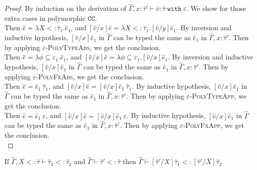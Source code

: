 \documentclass{llncs}
\newcommand{\keywadj}[1]{\mathtt{#1}}
\newcommand{\keyw}[1]{\keywadj{#1}~}
\newcommand{\kw}[1]{\keyw{ #1 }}
\newcommand{\kwa}[1]{\keywadj{ #1 }}
\begin{document}
\begin{proof} By induction on the derivation of $\hat \Gamma, x: \hat \tau' \vdash \hat e: \hat \tau~\kw{with} \varepsilon$. We show for those extra cases in polymorphic $\kwa{CC}$.\\



 Then $\hat e = \lambda X <: \hat \tau_1. \hat e_1$, and $[\hat v/x]\hat e = \lambda X <: \hat \tau_1. [\hat v/y]\hat e_1$. By inversion and inductive hypothesis, $[\hat v/x]\hat e_1$ in $\hat \Gamma$ can be typed the same as $\hat e_1$ in $\hat \Gamma, x: \hat \tau'$. Then by applying \textsc{$\varepsilon$-PolyTypeAbs}, we get the conclusion.\\

 Then $\hat e = \lambda \phi \subseteq \varepsilon_1. \hat e_1$, and $[\hat v/x]\hat e = \lambda \phi \subseteq \varepsilon_1. [\hat v/x]\hat e_1$. By inversion and inductive hypothesis, $[\hat v/x]\hat e_1$ in $\hat \Gamma$ can be typed the same as $\hat e_1$ in $\hat \Gamma, x: \hat \tau'$. Then by applying \textsc{$\varepsilon$-PolyFxAbs}, we get the conclusion. \\


 Then $\hat e = \hat e_1~\hat \tau_1$, and $[\hat v/x]\hat e = [\hat v/x]\hat e_1~\hat \tau_1$. By inductive hypothesis, $[\hat v/x]\hat e_1$ in $\hat \Gamma$ can be typed the same as $\hat e_1$ in $\hat \Gamma, x: \hat \tau'$. Then by applying \textsc{$\varepsilon$-PolyTypeApp}, we get the conclusion.\\

 Then $\hat e = \hat e_1~\varepsilon$, and $[\hat v/x]\hat e = [\hat v/x]\hat e_1~\varepsilon$. By inductive hypothesis, $[\hat v/x]\hat e_1$ in $\hat \Gamma$ can be typed the same as $\hat e_1$ in $\hat \Gamma, x: \hat \tau'$. Then by applying \textsc{$\varepsilon$-PolyFxApp}, we get the conclusion.\\



\end{proof}


\hrulefill

\begin{lemma}
If $\hat \Gamma, X <: \hat \tau \vdash \hat \tau_1 <: \hat \tau_2$ and $\hat \Gamma \vdash \hat \tau' <: \hat \tau$ then $\hat \Gamma \vdash [\hat \tau'/X]\hat \tau_1 <: [\hat \tau'/X]\hat \tau_2$
\end{lemma}
\end{document}
